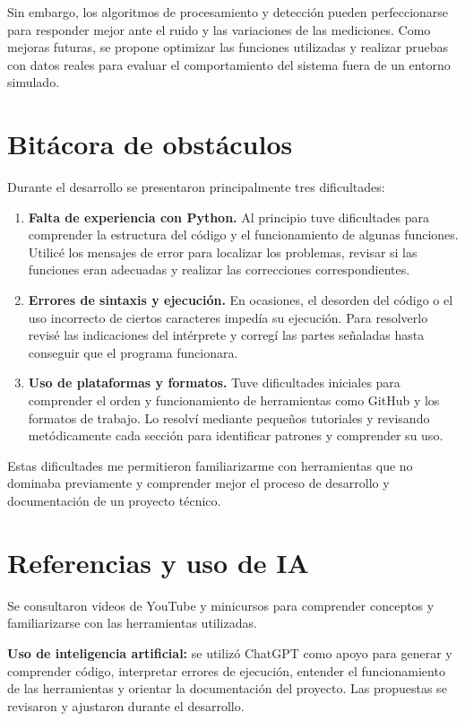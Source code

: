 \documentclass[10pt]{article}
\begin{document}
Sin embargo, los algoritmos de procesamiento y detección pueden perfeccionarse para responder mejor ante el ruido y las variaciones de las mediciones. Como mejoras futuras, se propone optimizar las funciones utilizadas y realizar pruebas con datos reales para evaluar el comportamiento del sistema fuera de un entorno simulado.

\newpage

\section{Bitácora de obstáculos}

Durante el desarrollo se presentaron principalmente tres dificultades:

\begin{enumerate}
\item \textbf{Falta de experiencia con Python.} Al principio tuve dificultades para comprender la estructura del código y el funcionamiento de algunas funciones. Utilicé los mensajes de error para localizar los problemas, revisar si las funciones eran adecuadas y realizar las correcciones correspondientes.

\item \textbf{Errores de sintaxis y ejecución.} En ocasiones, el desorden del código o el uso incorrecto de ciertos caracteres impedía su ejecución. Para resolverlo revisé las indicaciones del intérprete y corregí las partes señaladas hasta conseguir que el programa funcionara.

\item \textbf{Uso de plataformas y formatos.} Tuve dificultades iniciales para comprender el orden y funcionamiento de herramientas como GitHub y los formatos de trabajo. Lo resolví mediante pequeños tutoriales y revisando metódicamente cada sección para identificar patrones y comprender su uso.
\end{enumerate}

Estas dificultades me permitieron familiarizarme con herramientas que no dominaba previamente y comprender mejor el proceso de desarrollo y documentación de un proyecto técnico.

\section{Referencias y uso de IA}

Se consultaron videos de YouTube y minicursos para comprender conceptos y familiarizarse con las herramientas utilizadas.

\textbf{Uso de inteligencia artificial:} se utilizó ChatGPT como apoyo para generar y comprender código, interpretar errores de ejecución, entender el funcionamiento de las herramientas y orientar la documentación del proyecto. Las propuestas se revisaron y ajustaron durante el desarrollo.
\end{document}
